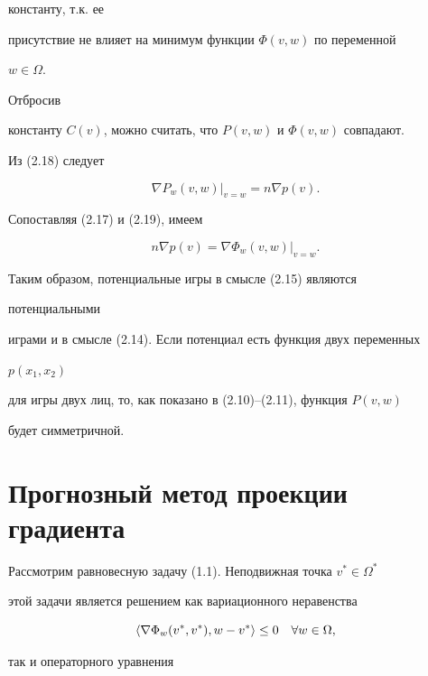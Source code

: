 константу, т.к. ее


присутствие не влияет на минимум функции $\Phi(v,w)$ по переменной


$w\in \Omega$.


Отбросив


константу $C(v)$, можно считать, что $P(v,w)$ и $\Phi(v,w)$ совпадают.





Из (2.18) следует


\begin{equation}


\nabla P_w(v,w)|_{v=w}=n\nabla p(v).


\end{equation}


Сопоставляя (2.17) и (2.19), имеем


$$


n\nabla p(v)=\nabla\Phi_w(v,w)|_{v=w}.


$$


Таким образом, потенциальные игры в смысле (2.15) являются


потенциальными


играми и в смысле (2.14). Если потенциал есть функция двух переменных


$p(x_1,x_2)$


для игры двух лиц, то, как показано в (2.10)--(2.11), функция $P(v,w)$


будет симметричной.





\section{Прогнозный метод проекции градиента}





Рассмотрим равновесную задачу (1.1). Неподвижная точка $v^*\in\Omega^*$


этой задачи является решением как вариационного неравенства


\begin{equation}


\la\nabla\Phi_w(v^*,v^*),w-v^*\ra \le 0\quad


\forall w\in \Omega,


\end{equation}


так и операторного уравнения



